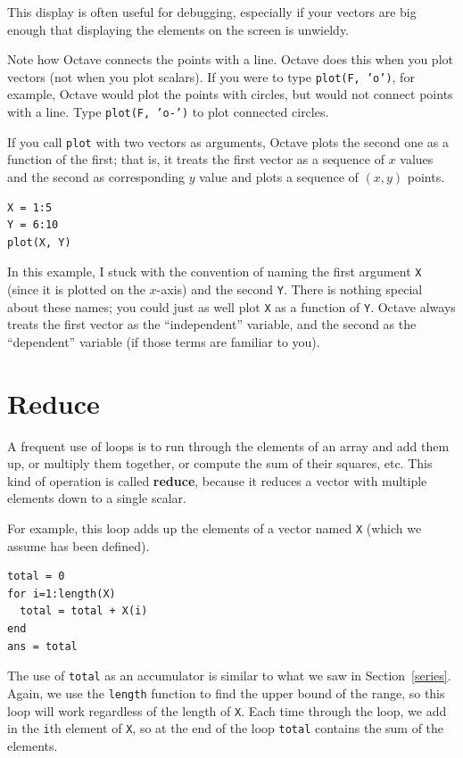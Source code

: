 \documentclass{book}
\begin{document}
This display is often useful for debugging, especially
if your vectors are big enough that displaying the elements on
the screen is unwieldy.

Note how Octave connects the points with a line. Octave does this when you plot
vectors (not when you plot scalars). If you were to type {\tt plot(F, 'o')},
for example, Octave would plot the points with circles, but would not connect
points with a line. Type {\tt plot(F, 'o-')} to plot connected circles.

If you call {\tt plot} with two vectors as arguments, Octave plots
the second one as a function of the first; that is, it treats
the first vector as a sequence of $x$ values and the second as
corresponding $y$ value and plots a sequence of $(x, y)$ points.

\begin{verbatim}
X = 1:5
Y = 6:10
plot(X, Y)
\end{verbatim}

In this example, I stuck with the convention of naming the first
argument {\tt X} (since it is plotted on the $x$-axis) and the
second {\tt Y}. There is nothing special about these names;
you could just as well plot {\tt X} as a function of {\tt Y}.
Octave always treats the first vector as the ``independent''
variable, and the second as the ``dependent'' variable (if those
terms are familiar to you).



\section{Reduce}
\label{reduce}

A frequent use of loops is to run through the elements of an array
and add them up, or multiply them together, or compute the sum
of their squares, etc. This kind of operation is called {\bf reduce},
because it reduces a vector with multiple elements down to a single
scalar.

For example, this loop adds up the elements of a vector named {\tt X}
(which we assume has been defined).

\begin{verbatim}
total = 0
for i=1:length(X)
  total = total + X(i)
end
ans = total
\end{verbatim}

The use of {\tt total} as an accumulator is similar to what we
saw in Section~\ref{series}. Again, we use the {\tt length} function
to find the upper bound of the range, so this loop will work
regardless of the length of {\tt X}.
Each time through the loop, we add
in the {\tt i}th element of {\tt X}, so at the end of the loop
{\tt total} contains the sum of the elements.
\end{document}
